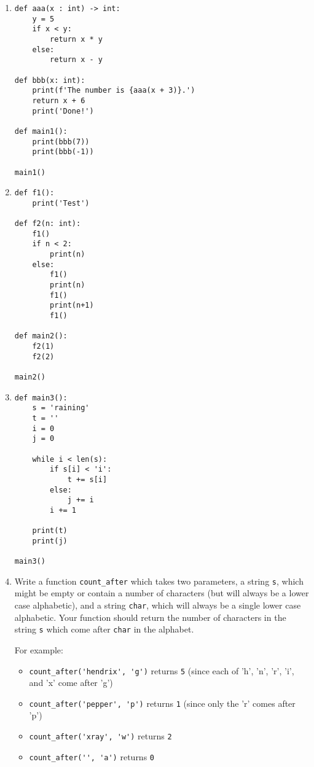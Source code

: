 \documentclass{article}
\begin{document}
\begin{enumerate}

\item \mbox{} \label{traceAAA}
\begin{verbatim}
def aaa(x : int) -> int:
    y = 5
    if x < y:
        return x * y
    else:
        return x - y

def bbb(x: int):
    print(f'The number is {aaa(x + 3)}.')
    return x + 6
    print('Done!')

def main1():
    print(bbb(7))
    print(bbb(-1))

main1()
\end{verbatim}




\newpage

\item \mbox{} \label{tracef1}
\begin{verbatim}
def f1():
    print('Test')

def f2(n: int):
    f1()
    if n < 2:
        print(n)
    else:
        f1()
        print(n)
        f1()
        print(n+1)
        f1()

def main2():
    f2(1)
    f2(2)

main2()
\end{verbatim}

\newpage
\item \mbox{} \label{traceWhile}

\begin{verbatim}
def main3():
    s = 'raining'
    t = ''
    i = 0
    j = 0

    while i < len(s):
        if s[i] < 'i':
            t += s[i]
        else:
            j += i
        i += 1

    print(t)
    print(j)

main3()
\end{verbatim}

\eject
\item Write a function \verb|count_after| which takes two parameters, a string \verb|s|, which might be empty or contain a number of characters (but will always be a lower case alphabetic), and a string \verb|char|, which will always be a single lower case alphabetic. Your function should return the number of characters in the string \verb|s| which come after \verb|char| in the alphabet.

    For example:
    \begin{itemize}
      \item \verb|count_after('hendrix', 'g')| returns \verb|5| (since each of 'h', 'n', 'r', 'i', and 'x' come after 'g')
      \item \verb|count_after('pepper', 'p')| returns \verb|1| (since only the 'r' comes after 'p')
      \item \verb|count_after('xray', 'w')| returns \verb|2|
      \item \verb|count_after('', 'a')| returns \verb|0|
    \end{itemize}


\end{enumerate}
\end{document}
